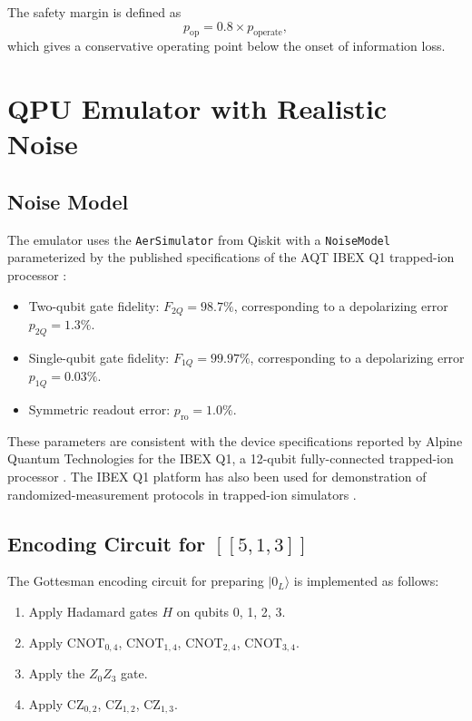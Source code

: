 \documentclass[12pt,a4paper,oneside]{book}
\theoremstyle{plain}
\theoremstyle{definition}
\theoremstyle{remark}
\begin{document}
The safety margin is defined as
\begin{equation}
    \label{eq:safety_margin}
    p_{\text{op}} = 0.8 \times p_{\text{operate}},
\end{equation}
which gives a conservative operating point below the onset of information loss.

\section{QPU Emulator with Realistic Noise}
\label{sec:emulator}

\subsection{Noise Model}

The emulator uses the \texttt{AerSimulator} from Qiskit with a \texttt{NoiseModel} parameterized by the published specifications of the AQT IBEX Q1 trapped-ion processor \cite{aqt_ibex}:
\begin{itemize}[itemsep=2pt]
    \item Two-qubit gate fidelity: $F_{2Q} = 98.7\%$, corresponding to a depolarizing error $p_{2Q} = 1.3\%$.
    \item Single-qubit gate fidelity: $F_{1Q} = 99.97\%$, corresponding to a depolarizing error $p_{1Q} = 0.03\%$.
    \item Symmetric readout error: $p_{\text{ro}} = 1.0\%$.
\end{itemize}

These parameters are consistent with the device specifications reported by Alpine Quantum Technologies for the IBEX Q1, a 12-qubit fully-connected trapped-ion processor \cite{aqt_ibex}. The IBEX Q1 platform has also been used for demonstration of randomized-measurement protocols in trapped-ion simulators \cite{brydges2019probing}.

\subsection{Encoding Circuit for $[[5,1,3]]$}

The Gottesman encoding circuit for preparing $|0_L\rangle$ is implemented as follows:
\begin{enumerate}[itemsep=2pt]
    \item Apply Hadamard gates $H$ on qubits 0, 1, 2, 3.
    \item Apply $\text{CNOT}_{0,4}$, $\text{CNOT}_{1,4}$, $\text{CNOT}_{2,4}$, $\text{CNOT}_{3,4}$.
    \item Apply the $Z_0 Z_3$ gate.
    \item Apply $\text{CZ}_{0,2}$, $\text{CZ}_{1,2}$, $\text{CZ}_{1,3}$.
\end{enumerate}
\end{document}
